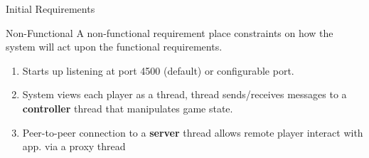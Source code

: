 \documentclass[12pt]{report}
\begin{document}
\begin{chapter}{Initial Requirements}
\begin{subsection}{Non-Functional}
A non-functional requirement place constraints on how the system will act upon the functional requirements.\\
\begin{enumerate}
\item Starts up listening at port 4500 (default) or configurable port.
\item System views each player as a thread, thread sends/receives messages to a \textbf{controller} thread that manipulates game state.
\item Peer-to-peer connection to a \textbf{server} thread allows remote player interact with app. via a proxy thread
\end{enumerate}
\end{subsection}

\end{chapter}
\end{document}
